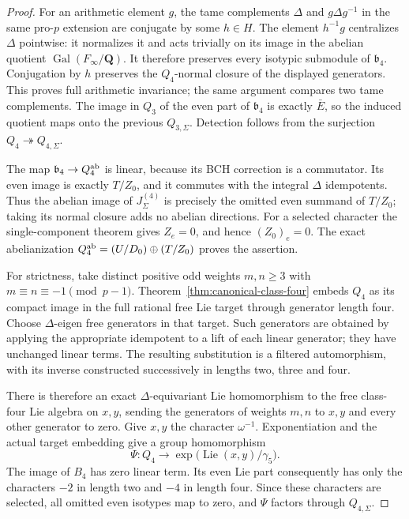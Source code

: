 \documentclass[11pt]{article}
\theoremstyle{definition}\newtheorem{definition}[theorem]{Definition}
\begin{document}
\begin{proof}
For an arithmetic element $g$, the tame complements
$\Delta$ and $g\Delta g^{-1}$ in the same pro-$p$
extension are conjugate by some $h\in H$.
The element $h^{-1}g$ centralizes $\Delta$ pointwise:
it normalizes it and acts trivially on its image in
the abelian quotient $\operatorname{Gal}(F_\infty/\mathbf Q)$.
It therefore preserves every isotypic submodule of
$\mathfrak b_4$. Conjugation by $h$ preserves the
$Q_4$-normal closure of the displayed generators.
This proves full arithmetic invariance; the same
argument compares two tame complements. The image
in $Q_3$ of the even part of $\mathfrak b_4$ is exactly
$\bar E$, so the induced quotient maps onto the
previous $Q_{3,\Sigma}$. Detection follows from the
surjection $Q_4\twoheadrightarrow Q_{4,\Sigma}$.

The map $\mathfrak b_4\to Q_4^{\rm ab}$ is linear,
because its BCH correction is a commutator.
Its even image is exactly $T/Z_0$, and it commutes
with the integral $\Delta$ idempotents. Thus the
abelian image of $J_\Sigma^{(4)}$ is precisely the
omitted even summand of $T/Z_0$; taking its normal
closure adds no abelian directions. For a selected
character the single-component theorem gives $Z_e=0$,
and hence $(Z_0)_e=0$. The exact abelianization
$Q_4^{\rm ab}=(U/D_0)\oplus(T/Z_0)$ proves the assertion.

For strictness, take distinct positive odd weights
$m,n\geq3$ with $m\equiv n\equiv-1\pmod{p-1}$.
Theorem~\ref{thm:canonical-class-four} embeds $Q_4$
as its compact image in the full rational free Lie
target through generator length four. Choose
$\Delta$-eigen free generators in that target. Such
generators are obtained by applying the appropriate
idempotent to a lift of each linear generator; they
have unchanged linear terms. The resulting substitution
is a filtered automorphism, with its inverse constructed
successively in lengths two, three and four.

There is therefore an exact $\Delta$-equivariant Lie
homomorphism to the free class-four Lie algebra on
$x,y$, sending the generators of weights $m,n$ to
$x,y$ and every other generator to zero. Give $x,y$
the character $\omega^{-1}$. Exponentiation and the
actual target embedding give a group homomorphism
\[
       \Psi:Q_4\longrightarrow
           \exp\bigl(\operatorname{Lie}(x,y)/\gamma_5\bigr).
\]
The image of $B_4$ has zero linear term. Its even
Lie part consequently has only the characters $-2$
in length two and $-4$ in length four. Since these
characters are selected, all omitted even isotypes
map to zero, and $\Psi$ factors through $Q_{4,\Sigma}$.


\end{proof}
\end{document}
